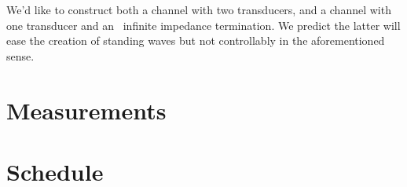 We'd like to construct both a channel with two transducers, and a channel with one transducer and an ~infinite impedance termination. We predict the latter will ease the creation of standing waves but not controllably in the aforementioned sense.

\section{Measurements}

\section{Schedule}








